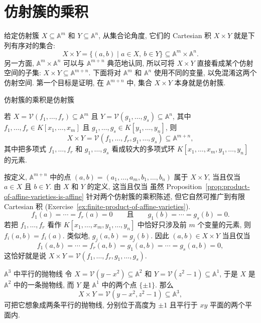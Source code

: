 \section{仿射簇的乘积}\label{sec:products-of-affine-varieties}

给定仿射簇 $X\subseteq\mathbb{A}^{m}$ 和 $Y\subseteq\mathbb{A}^{n}$, 从集合论角度, 它们的 Cartesian 积 $X\times Y$ 就是下列有序对的集合:
\[
  X\times Y=\{(a,b)\mid a\in X,\ b\in Y\}\subseteq\mathbb{A}^{m}\times\mathbb{A}^{n}.
\]
\BookPairedNote
  {另一方面, $\mathbb{A}^{m}\times\mathbb{A}^{n}$ 可以与 $\mathbb{A}^{m+n}$ 典范地认同, 所以可将 $X\times Y$ 直接看成某个仿射空间的子集: $X\times Y\subseteq\mathbb{A}^{m+n}$.}
  {下面将对 $\mathbb{A}^{m}$ 和 $\mathbb{A}^{n}$ 使用不同的变量, 以免混淆这两个仿射空间.}
第一个目标是证明, 在 $\mathbb{A}^{m+n}$ 中, 集合 $X\times Y$ 本身就是仿射簇.

\begin{Proposition}{仿射簇的乘积是仿射簇}\leavevmode\label{prop:product-of-affine-varieties-is-affine}\strut\par\nopagebreak[4]\noindent
若 $X=\mathcal{V}(f_{1},\ldots,f_{r})\subseteq\mathbb{A}^{m}$ 且 $Y=\mathcal{V}(g_{1},\ldots,g_{s})\subseteq\mathbb{A}^{n}$, 其中 $f_{1},\ldots,f_{r}\in K[x_{1},\ldots,x_{m}]$ 且 $g_{1},\ldots,g_{s}\in K[y_{1},\ldots,y_{n}]$, 则
\[
  X\times Y=\mathcal{V}(f_{1},\ldots,f_{r},g_{1},\ldots,g_{s})\subseteq\mathbb{A}^{m+n},
\]
其中把多项式 $f_{1},\ldots,f_{r}$ 和 $g_{1},\ldots,g_{s}$ 看成较大的多项式环 $K[x_{1},\ldots,x_{m},y_{1},\ldots,y_{n}]$ 的元素.
\end{Proposition}
\begin{Proof}
\BookPairedNoteLeft
  {按定义, $\mathbb{A}^{m+n}$ 中的点 $(a,b)=(a_{1},\ldots,a_{m},b_{1},\ldots,b_{n})$ 属于 $X\times Y$, 当且仅当 $a\in X$ 且 $b\in Y$. 由 $X$ 和 $Y$ 的定义, 这当且仅当}
  {虽然 Proposition~\ref{prop:product-of-affine-varieties-is-affine} 针对两个仿射簇的乘积陈述, 但它自然可推广到有限 Cartesian 积 (Exercise~\ref{ex:finite-product-of-affine-varieties}).}
\[
  f_{1}(a)=\cdots=f_{r}(a)=0
  \qquad\text{且}\qquad g_{1}(b)=\cdots=g_{s}(b)=0.
\]
若把 $f_{1},\ldots,f_{r}$ 看作 $K[x_{1},\ldots,x_{m},y_{1},\ldots,y_{n}]$ 中恰好只涉及前 $m$ 个变量的元素, 则 $f_{i}(a,b)=f_{i}(a)$. 类似地, $g_{j}(a,b)=g_{j}(b)$. 因此 $(a,b)\in X\times Y$ 当且仅当
\[
  f_{1}(a,b)=\cdots=f_{r}(a,b)=g_{1}(a,b)=\cdots=g_{s}(a,b)=0,
\]
这恰好就是说 $X\times Y=\mathcal{V}(f_{1},\ldots,f_{r},g_{1},\ldots,g_{s})$.
\end{Proof}

\begin{Example}{$\mathbb{A}^{3}$ 中平行的抛物线}\leavevmode\label{ex:product-parallel-parabolas}
令 $X=\mathcal{V}(y-x^{2})\subseteq\mathbb{A}^{2}$ 和 $Y=\mathcal{V}(z^{2}-1)\subseteq\mathbb{A}^{1}$, 于是 $X$ 是 $\mathbb{A}^{2}$ 中的一条抛物线, 而 $Y$ 是 $\mathbb{A}^{1}$ 中的两个点 $\{\pm1\}$. 那么
\[
  X\times Y=\mathcal{V}(y-x^{2},z^{2}-1)\subseteq\mathbb{A}^{3},
\]
可把它想象成两条平行的抛物线, 分别位于高度为 $\pm1$ 且平行于 $xy$ 平面的两个平面内.
\end{Example}

